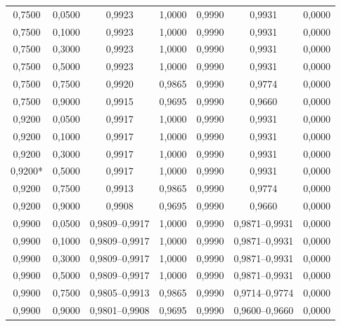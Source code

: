\begin{longtable}{ccccccc}
0,7500 & 0,0500 & 0,9923 & 1,0000 & 0,9990 & 0,9931 & 0,0000 \\
0,7500 & 0,1000 & 0,9923 & 1,0000 & 0,9990 & 0,9931 & 0,0000 \\
0,7500 & 0,3000 & 0,9923 & 1,0000 & 0,9990 & 0,9931 & 0,0000 \\
0,7500 & 0,5000 & 0,9923 & 1,0000 & 0,9990 & 0,9931 & 0,0000 \\
0,7500 & 0,7500 & 0,9920 & 0,9865 & 0,9990 & 0,9774 & 0,0000 \\
0,7500 & 0,9000 & 0,9915 & 0,9695 & 0,9990 & 0,9660 & 0,0000 \\
0,9200 & 0,0500 & 0,9917 & 1,0000 & 0,9990 & 0,9931 & 0,0000 \\
0,9200 & 0,1000 & 0,9917 & 1,0000 & 0,9990 & 0,9931 & 0,0000 \\
0,9200 & 0,3000 & 0,9917 & 1,0000 & 0,9990 & 0,9931 & 0,0000 \\
0,9200* & 0,5000 & 0,9917 & 1,0000 & 0,9990 & 0,9931 & 0,0000 \\
0,9200 & 0,7500 & 0,9913 & 0,9865 & 0,9990 & 0,9774 & 0,0000 \\
0,9200 & 0,9000 & 0,9908 & 0,9695 & 0,9990 & 0,9660 & 0,0000 \\
0,9900 & 0,0500 & 0,9809--0,9917 & 1,0000 & 0,9990 & 0,9871--0,9931 & 0,0000 \\
0,9900 & 0,1000 & 0,9809--0,9917 & 1,0000 & 0,9990 & 0,9871--0,9931 & 0,0000 \\
0,9900 & 0,3000 & 0,9809--0,9917 & 1,0000 & 0,9990 & 0,9871--0,9931 & 0,0000 \\
0,9900 & 0,5000 & 0,9809--0,9917 & 1,0000 & 0,9990 & 0,9871--0,9931 & 0,0000 \\
0,9900 & 0,7500 & 0,9805--0,9913 & 0,9865 & 0,9990 & 0,9714--0,9774 & 0,0000 \\
0,9900 & 0,9000 & 0,9801--0,9908 & 0,9695 & 0,9990 & 0,9600--0,9660 & 0,0000 \\
\end{longtable}


